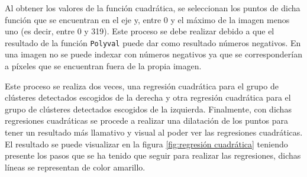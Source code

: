 Al obtener los valores de la función cuadrática, se seleccionan los puntos de dicha función que se encuentran en el eje y, entre 0 y el máximo de la imagen menos uno (es decir, entre 0 y 319). 
Este proceso se debe realizar debido a que el resultado de la función \texttt{Polyval} puede dar como resultado números negativos. En una imagen no se puede indexar con números negativos ya que 
se corresponderían a píxeles que se encuentran fuera de la propia imagen.

Este proceso se realiza dos veces, una regresión cuadrática para el grupo de clústeres detectados escogidos de la derecha y otra regresión cuadrática para el grupo de clústeres detectados
escogidos de la izquierda. 
Finalmente, con dichas regresiones cuadráticas se procede a realizar una dilatación de los puntos para tener un resultado más llamativo y visual al poder
ver las regresiones cuadráticas. El resultado se puede visualizar en la figura \ref{fig:regresión cuadrática} teniendo presente los pasos que se ha tenido que seguir para 
realizar las regresiones, dichas líneas se representan de color amarillo.


  

